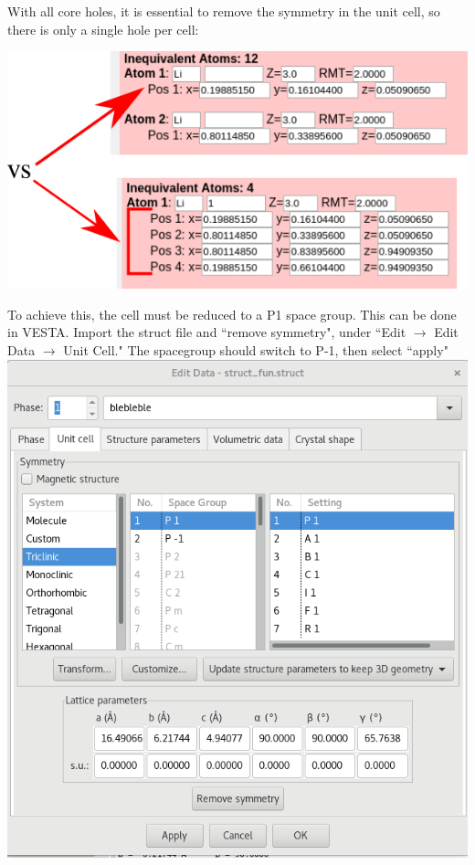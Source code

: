 \documentclass[12pt]{article}
\begin{document}
With all core holes, it is essential to remove the symmetry in the unit cell, so there is only a single hole per cell: 

\includegraphics[scale=0.5]{./images/isolated_struct.png}

To achieve this, the cell must be reduced to a P1 space group.  This can be done in VESTA.  Import the struct file and ``remove symmetry", under ``Edit $\to$  Edit Data $\to$ Unit Cell." The spacegroup should switch to P-1, then select ``apply" \\

\includegraphics[scale=0.3]{./images/vesta_struct_edit.png}\\
\end{document}
